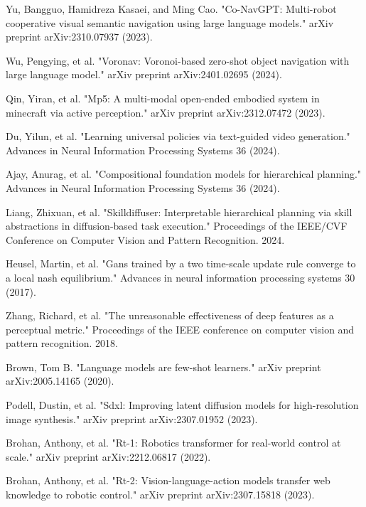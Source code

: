 \begin{thebibliography}{99}
 Yu, Bangguo, Hamidreza Kasaei, and Ming Cao. "Co-NavGPT: Multi-robot cooperative visual semantic navigation using large language models." arXiv preprint arXiv:2310.07937 (2023).

 Wu, Pengying, et al. "Voronav: Voronoi-based zero-shot object navigation with large language model." arXiv preprint arXiv:2401.02695 (2024).

 Qin, Yiran, et al. "Mp5: A multi-modal open-ended embodied system in minecraft via active perception." arXiv preprint arXiv:2312.07472 (2023).

 Du, Yilun, et al. "Learning universal policies via text-guided video generation." Advances in Neural Information Processing Systems 36 (2024).

 Ajay, Anurag, et al. "Compositional foundation models for hierarchical planning." Advances in Neural Information Processing Systems 36 (2024).

 Liang, Zhixuan, et al. "Skilldiffuser: Interpretable hierarchical planning via skill abstractions in diffusion-based task execution." Proceedings of the IEEE/CVF Conference on Computer Vision and Pattern Recognition. 2024.

 Heusel, Martin, et al. "Gans trained by a two time-scale update rule converge to a local nash equilibrium." Advances in neural information processing systems 30 (2017).

 Zhang, Richard, et al. "The unreasonable effectiveness of deep features as a perceptual metric." Proceedings of the IEEE conference on computer vision and pattern recognition. 2018.

 Brown, Tom B. "Language models are few-shot learners." arXiv preprint arXiv:2005.14165 (2020).

 Podell, Dustin, et al. "Sdxl: Improving latent diffusion models for high-resolution image synthesis." arXiv preprint arXiv:2307.01952 (2023).

 Brohan, Anthony, et al. "Rt-1: Robotics transformer for real-world control at scale." arXiv preprint arXiv:2212.06817 (2022).

 Brohan, Anthony, et al. "Rt-2: Vision-language-action models transfer web knowledge to robotic control." arXiv preprint arXiv:2307.15818 (2023).


\end{thebibliography}
